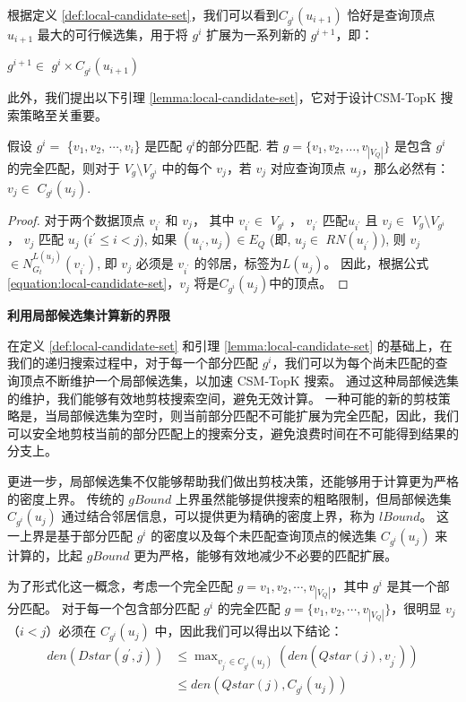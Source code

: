 根据定义 \ref{def:local-candidate-set}，我们可以看到$C_{g^i}(u_{i+1})$ 恰好是查询顶点 $u_{i+1}$ 最大的可行候选集，用于将 $g^i$ 扩展为一系列新的 $g^{i+1}$，即：

$g^{i+1}\in$ $g^i\times C_{g^i}(u_{i+1})$

此外，我们提出以下引理 \ref{lemma:local-candidate-set}，它对于设计CSM-TopK 搜索策略至关重要。

\begin{lemma} \label{lemma:local-candidate-set}
    假设 $g^i=$ \{$v_1, v_2$, $\cdots, v_i$\} 是匹配 $q^i$的部分匹配.
    若 $g=\{v_1, v_2, \dots, v_{|V_Q|}\}$ 是包含 $g^i$ 的完全匹配，则对于 $V_g\setminus V_{g^i}$ 中的每个 $v_j$，若 $v_j$ 对应查询顶点 $u_j$，那么必然有：
       $v_j\in$ $C_{g^i}(u_j)$.
    \end{lemma}

\begin{proof}
        对于两个数据顶点 $v_{i^\prime}$ 和 $v_j$， 其中 $v_{i^\prime}\in$ $V_{g^i}$ ，  $v_{i^\prime}$ 匹配$u_{i^\prime}$ 
            且 $v_{j}\in$ $V_{g}\setminus V_{g^i}$ ， $v_{j}$ 匹配 $u_j$ ($i^\prime\leq i<j$), 
            如果 $(u_{i^\prime}, u_j)\in E_Q$ (即, $u_j\in$ $RN(u_{i^\prime})$), 则 $v_j$ $\in N_{G_t}^{L(u_j)}(v_{i^\prime})$, 即 $v_j$ 必须是 $v_{i^\prime}$ 的邻居，标签为$L(u_j)$。
            因此，根据公式\ref{equation:local-candidate-set}，$v_j$ 将是$C_{g^i}(u_j)$中的顶点。
\end{proof}

\textbf{利用局部候选集计算新的界限}

在定义 \ref{def:local-candidate-set} 和引理 \ref{lemma:local-candidate-set} 的基础上，在我们的递归搜索过程中，对于每一个部分匹配 $g^i$，我们可以为每个尚未匹配的查询顶点不断维护一个局部候选集，以加速 CSM-TopK 搜索。
通过这种局部候选集的维护，我们能够有效地剪枝搜索空间，避免无效计算。
一种可能的新的剪枝策略是，当局部候选集为空时，则当前部分匹配不可能扩展为完全匹配，因此，我们可以安全地剪枝当前的部分匹配上的搜索分支，避免浪费时间在不可能得到结果的分支上。

更进一步，局部候选集不仅能够帮助我们做出剪枝决策，还能够用于计算更为严格的密度上界。
传统的 $gBound$ 上界虽然能够提供搜索的粗略限制，但局部候选集 $C_{g^i}(u_j)$ 通过结合邻居信息，可以提供更为精确的密度上界，称为 $lBound$。
这一上界是基于部分匹配 $g^i$ 的密度以及每个未匹配查询顶点的候选集 $C_{g^i}(u_j)$ 来计算的，比起 $gBound$ 更为严格，能够有效地减少不必要的匹配扩展。

为了形式化这一概念，考虑一个完全匹配 $g={v_1, v_2, \cdots, v_{|V_Q|}}$，其中 $g^i$ 是其一个部分匹配。
对于每一个包含部分匹配 $g^i$ 的完全匹配 $g=\{v_1, v_2, \cdots, v_{|V_Q|}\}$，很明显 $v_j$（$i < j$）必须在 $C_{g^i}(u_j)$ 中，因此我们可以得出以下结论：
\begin{equation*}
    \begin{aligned}
      den(Dstar(g^\prime, j)) & \leq \max\nolimits_{v_{j^\prime}\in C_{g^i}(u_j)}\left(den(Qstar(j), v_{j^\prime})\right) \\
        & \leq den(Qstar(j), C_{g^i}(u_j))
    \end{aligned}
\end{equation*}


